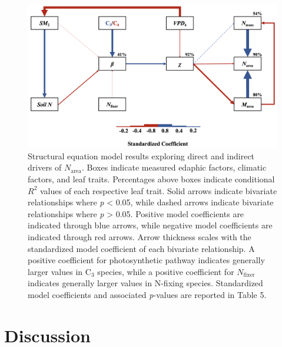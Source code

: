 \newpage
\begin{landscape}
    \begin{figure}
        \centering
        \includegraphics[scale = 0.3]{ch4_TXeco/figs/TXeco_fig5_SEM.png}
        \caption[Structural equation model results exploring direct and indirect drivers of $N_\mathrm{area}$]{Structural equation model results exploring direct and indirect drivers of $N_\mathrm{area}$. Boxes indicate measured edaphic factors, climatic factors, and leaf traits. Percentages above boxes indicate conditional $R^{2}$ values of each respective leaf trait. Solid arrows indicate bivariate relationships where \textit{p} < 0.05, while dashed arrows indicate bivariate relationships where \textit{p} > 0.05. Positive model coefficients are indicated through blue arrows, while negative model coefficients are indicated through red arrows. Arrow thickness scales with the standardized model coefficient of each bivariate relationship. A positive coefficient for photosynthetic pathway indicates generally larger values in C$_3$ species, while a positive coefficient for $N_\mathrm{fixer}$ indicates generally larger values in N-fixing species. Standardized model coefficients and associated \textit{p}-values are reported in Table 5.}
        \label{fig:figure4.5}
    \end{figure}
\end{landscape}
\clearpage


\section{Discussion}